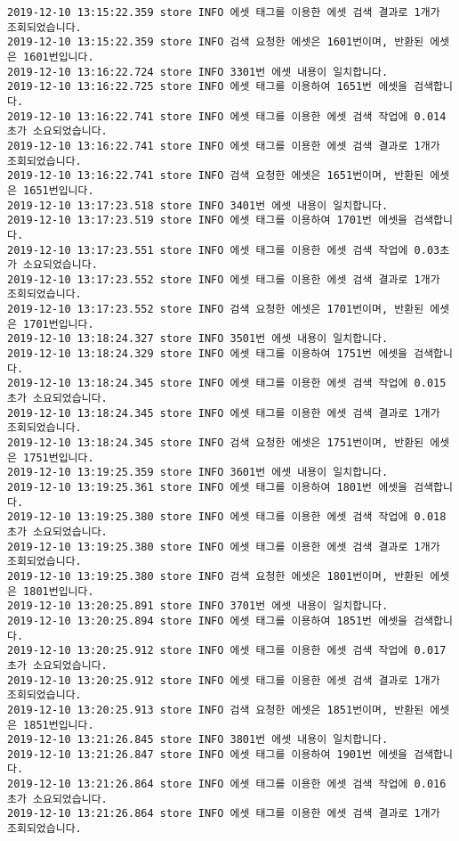 \begin{Verbatim}[fontsize=\tiny, breaklines=true, breakanywhere=true]
2019-12-10 13:15:22.359 store INFO 에셋 태그를 이용한 에셋 검색 결과로 1개가 조회되었습니다.
2019-12-10 13:15:22.359 store INFO 검색 요청한 에셋은 1601번이며, 반환된 에셋은 1601번입니다.
2019-12-10 13:16:22.724 store INFO 3301번 에셋 내용이 일치합니다.
2019-12-10 13:16:22.725 store INFO 에셋 태그를 이용하여 1651번 에셋을 검색합니다.
2019-12-10 13:16:22.741 store INFO 에셋 태그를 이용한 에셋 검색 작업에 0.014초가 소요되었습니다.
2019-12-10 13:16:22.741 store INFO 에셋 태그를 이용한 에셋 검색 결과로 1개가 조회되었습니다.
2019-12-10 13:16:22.741 store INFO 검색 요청한 에셋은 1651번이며, 반환된 에셋은 1651번입니다.
2019-12-10 13:17:23.518 store INFO 3401번 에셋 내용이 일치합니다.
2019-12-10 13:17:23.519 store INFO 에셋 태그를 이용하여 1701번 에셋을 검색합니다.
2019-12-10 13:17:23.551 store INFO 에셋 태그를 이용한 에셋 검색 작업에 0.03초가 소요되었습니다.
2019-12-10 13:17:23.552 store INFO 에셋 태그를 이용한 에셋 검색 결과로 1개가 조회되었습니다.
2019-12-10 13:17:23.552 store INFO 검색 요청한 에셋은 1701번이며, 반환된 에셋은 1701번입니다.
2019-12-10 13:18:24.327 store INFO 3501번 에셋 내용이 일치합니다.
2019-12-10 13:18:24.329 store INFO 에셋 태그를 이용하여 1751번 에셋을 검색합니다.
2019-12-10 13:18:24.345 store INFO 에셋 태그를 이용한 에셋 검색 작업에 0.015초가 소요되었습니다.
2019-12-10 13:18:24.345 store INFO 에셋 태그를 이용한 에셋 검색 결과로 1개가 조회되었습니다.
2019-12-10 13:18:24.345 store INFO 검색 요청한 에셋은 1751번이며, 반환된 에셋은 1751번입니다.
2019-12-10 13:19:25.359 store INFO 3601번 에셋 내용이 일치합니다.
2019-12-10 13:19:25.361 store INFO 에셋 태그를 이용하여 1801번 에셋을 검색합니다.
2019-12-10 13:19:25.380 store INFO 에셋 태그를 이용한 에셋 검색 작업에 0.018초가 소요되었습니다.
2019-12-10 13:19:25.380 store INFO 에셋 태그를 이용한 에셋 검색 결과로 1개가 조회되었습니다.
2019-12-10 13:19:25.380 store INFO 검색 요청한 에셋은 1801번이며, 반환된 에셋은 1801번입니다.
2019-12-10 13:20:25.891 store INFO 3701번 에셋 내용이 일치합니다.
2019-12-10 13:20:25.894 store INFO 에셋 태그를 이용하여 1851번 에셋을 검색합니다.
2019-12-10 13:20:25.912 store INFO 에셋 태그를 이용한 에셋 검색 작업에 0.017초가 소요되었습니다.
2019-12-10 13:20:25.912 store INFO 에셋 태그를 이용한 에셋 검색 결과로 1개가 조회되었습니다.
2019-12-10 13:20:25.913 store INFO 검색 요청한 에셋은 1851번이며, 반환된 에셋은 1851번입니다.
2019-12-10 13:21:26.845 store INFO 3801번 에셋 내용이 일치합니다.
2019-12-10 13:21:26.847 store INFO 에셋 태그를 이용하여 1901번 에셋을 검색합니다.
2019-12-10 13:21:26.864 store INFO 에셋 태그를 이용한 에셋 검색 작업에 0.016초가 소요되었습니다.
2019-12-10 13:21:26.864 store INFO 에셋 태그를 이용한 에셋 검색 결과로 1개가 조회되었습니다.

\end{Verbatim}

